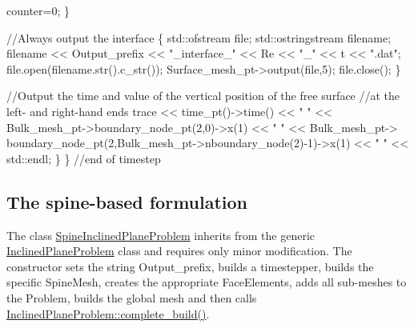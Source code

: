 \begin{DoxyCodeInclude}
     counter=0;
    \}

   \textcolor{comment}{//Always output the interface}
   \{
    std::ofstream file;
     std::ostringstream filename;
     filename << Output\_prefix << \textcolor{stringliteral}{"\_interface\_"} << Re << \textcolor{stringliteral}{"\_"} << t << \textcolor{stringliteral}{".dat"};
     file.open(filename.str().c\_str());
     Surface\_mesh\_pt->output(file,5);
     file.close();
   \}
   
   \textcolor{comment}{//Output the time and value of the vertical position of the free surface}
   \textcolor{comment}{//at the left- and right-hand ends}
   trace << time\_pt()->time() << \textcolor{stringliteral}{" "}
         << Bulk\_mesh\_pt->boundary\_node\_pt(2,0)->x(1) << \textcolor{stringliteral}{" "}
         << 
    Bulk\_mesh\_pt->
    boundary\_node\_pt(2,Bulk\_mesh\_pt->nboundary\_node(2)-1)->x(1) << \textcolor{stringliteral}{" "}
         << std::endl;
  \}
\} \textcolor{comment}{//end of timestep}

\end{DoxyCodeInclude}
\hypertarget{index_spine_prob}{}\subsection{The spine-\/based formulation}\label{index_spine_prob}
The class {\ttfamily \hyperlink{classSpineInclinedPlaneProblem}{Spine\+Inclined\+Plane\+Problem}} inherits from the generic {\ttfamily \hyperlink{classInclinedPlaneProblem}{Inclined\+Plane\+Problem}} class and requires only minor modification. The constructor sets the string {\ttfamily Output\+\_\+prefix}, builds a timestepper, builds the specific {\ttfamily Spine\+Mesh}, creates the appropriate {\ttfamily Face\+Elements}, adds all sub-\/meshes to the {\ttfamily Problem}, builds the global mesh and then calls {\ttfamily \hyperlink{classInclinedPlaneProblem_ae44e360be4a46e1343c3960c3a43380f}{Inclined\+Plane\+Problem\+::complete\+\_\+build()}}. 
